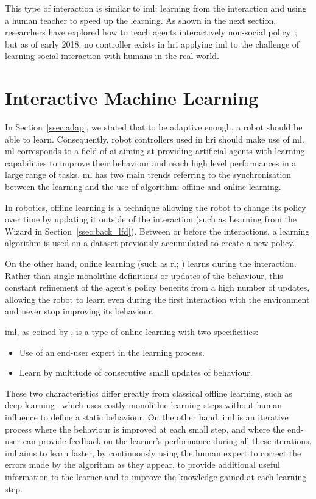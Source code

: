  This type of interaction is similar to \acrfull{iml}: learning from the interaction and using a human teacher to speed up the learning. As shown in the next section, researchers have explored how to teach agents interactively non-social policy~\citep{scheutz2017spoken,cakmak2010designing}; but as of early 2018, no controller exists in \gls{hri} applying \gls{iml} to the challenge of learning social interaction with humans in the real world.
  
\section{Interactive Machine Learning} \label{sec:back_iml}

In Section~\ref{ssec:adap}, we stated that to be adaptive enough, a robot should be able to learn. Consequently, robot controllers used in \gls{hri} should make use of \acrfull{ml}. 
\gls{ml} corresponds to a field of \gls{ai} aiming at providing artificial agents with learning capabilities to improve their behaviour and reach high level performances in a large range of tasks. \gls{ml} has two main trends referring to the synchronisation between the learning and the use of algorithm: offline and online learning.

In robotics, offline learning is a technique allowing the robot to change its policy over time by updating it outside of the interaction (such as Learning from the Wizard in Section~\ref{ssec:back_lfd}). Between or before the interactions, a learning algorithm is used on a dataset previously accumulated to create a new policy.

On the other hand, online learning (such as \gls{rl}; \citealt{sutton1998reinforcement}) learns during the interaction. Rather than single monolithic definitions or updates of the behaviour, this constant refinement of the agent's policy benefits from a high number of updates, allowing the robot to learn even during the first interaction with the environment and never stop improving its behaviour.

\acrfull{iml}, as coined by \cite{fails2003interactive}, is a type of online learning with two specificities:
\begin{itemize}
	\item Use of an end-user expert in the learning process.
	\item Learn by multitude of consecutive small updates of behaviour.
\end{itemize}
These two characteristics differ greatly from classical offline learning, such as deep learning~\citep{lecun2015deep} which uses costly monolithic learning steps without human influence to define a static behaviour. On the other hand, \gls{iml} is an iterative process where the behaviour is improved at each small step, and where the end-user can provide feedback on the learner's performance during all these iterations. \gls{iml} aims to learn faster, by continuously using the human expert to correct the errors made by the algorithm as they appear, to provide additional useful information to the learner and to improve the knowledge gained at each learning step.

